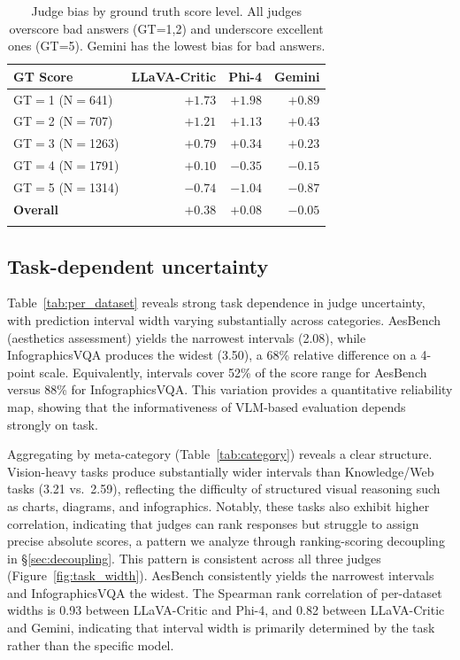 \documentclass{article}
\begin{document}
\begin{table}[t]
\centering
\caption{Judge bias by ground truth score level. All judges overscore bad answers (GT=1,2) and underscore excellent ones (GT=5). Gemini has the lowest bias for bad answers.}
\label{tab:bias2}
\small
\begin{tabular}{lrrr}
\toprule
\textbf{GT Score} & \textbf{LLaVA-Critic} & \textbf{Phi-4} & \textbf{Gemini} \\
\midrule
GT$=$1 (N$=$641) & $+1.73$ & $+1.98$ & $\mathbf{+0.89}$ \\
GT$=$2 (N$=$707) & $+1.21$ & $+1.13$ & $\mathbf{+0.43}$ \\
GT$=$3 (N$=$1263) & $+0.79$ & $+0.34$ & $\mathbf{+0.23}$ \\
GT$=$4 (N$=$1791) & $+0.10$ & $-0.35$ & $\mathbf{-0.15}$ \\
GT$=$5 (N$=$1314) & $-0.74$ & $-1.04$ & $\mathbf{-0.87}$ \\
\midrule
\textbf{Overall} & $+0.38$ & $+0.08$ & $\mathbf{-0.05}$ \\
\bottomrule\vspace{-15pt}
\end{tabular}
\end{table}

\subsection{Task-dependent uncertainty}
\label{sec:task_dependent}

Table~\ref{tab:per_dataset} reveals strong task dependence in judge uncertainty, with prediction interval width varying substantially across categories. AesBench (aesthetics assessment) yields the narrowest intervals (2.08), while InfographicsVQA produces the widest (3.50), a 68\% relative difference on a 4-point scale. Equivalently, intervals cover 52\% of the score range for AesBench versus 88\% for InfographicsVQA. This variation provides a quantitative reliability map, showing that the informativeness of VLM-based evaluation depends strongly on task.

Aggregating by meta-category (Table~\ref{tab:category}) reveals a clear structure. Vision-heavy tasks produce substantially wider intervals than Knowledge/Web tasks (3.21 vs.\ 2.59), reflecting the difficulty of structured visual reasoning such as charts, diagrams, and infographics. Notably, these tasks also exhibit higher correlation, indicating that judges can rank responses but struggle to assign precise absolute scores, a pattern we analyze through ranking-scoring decoupling in \S\ref{sec:decoupling}. This pattern is consistent across all three judges (Figure~\ref{fig:task_width}). AesBench consistently yields the narrowest intervals and InfographicsVQA the widest. The Spearman rank correlation of per-dataset widths is 0.93 between LLaVA-Critic and Phi-4, and 0.82 between LLaVA-Critic and Gemini, indicating that interval width is primarily determined by the task rather than the specific model.
\end{document}

